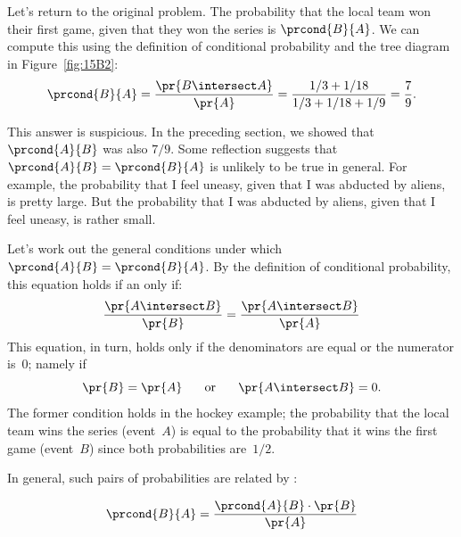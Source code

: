 Let's return to the original problem.  The probability that the
local team won their first game, given that they won the series
is $\prcond{B}{A}$.  We can compute this using the definition of
conditional probability and the tree diagram in Figure~\ref{fig:15B2}:
%
\begin{align*}
\prcond{B}{A}  = \frac{\pr{B \intersect A}}{\pr{A}} %
               = \frac{1/3 + 1/18}{1/3 + 1/18 + 1/9} %
               = \frac{7}{9}.
\end{align*}

\begin{editingnotes}

This answer is suspicious.  In the preceding section, we showed that
$\prcond{A}{B}$ was also $7/9$.  Some reflection suggests that
$\prcond{A}{B} = \prcond{B}{A}$ is unlikely to be true in general.
For example, the probability that I feel uneasy, given that I was
abducted by aliens, is pretty large.  But the probability that I was
abducted by aliens, given that I feel uneasy, is rather small.

Let's work out the general conditions under which $\prcond{A}{B} =
\prcond{B}{A}$.  By the definition of conditional probability, this
equation holds if an only if:
%
\[
\frac{\pr{A \intersect B}}{\pr{B}} = \frac{\pr{A \intersect B}}{\pr{A}}
\]
%
This equation, in turn, holds only if the denominators are equal or
the numerator is~0; namely if
%
\[
\pr{B} = \pr{A}
\hspace{0.25in} \text{or} \hspace{0.25in}
\pr{A \intersect B} = 0.
\]
%
The former condition holds in the hockey example; the probability that
the local team wins the series (event~$A$) is equal to the
probability that it wins the first game (event~$B$) since both
probabilities are~$1/2$.
\end{editingnotes}

In general, such pairs of probabilities are related by :
%
\begin{theorem}
%
\begin{equation}\label{bayesrule}
    \prcond{B}{A} = \frac{\prcond{A}{B} \cdot \pr{B}}{\pr{A}}
\end{equation}
\end{theorem}

